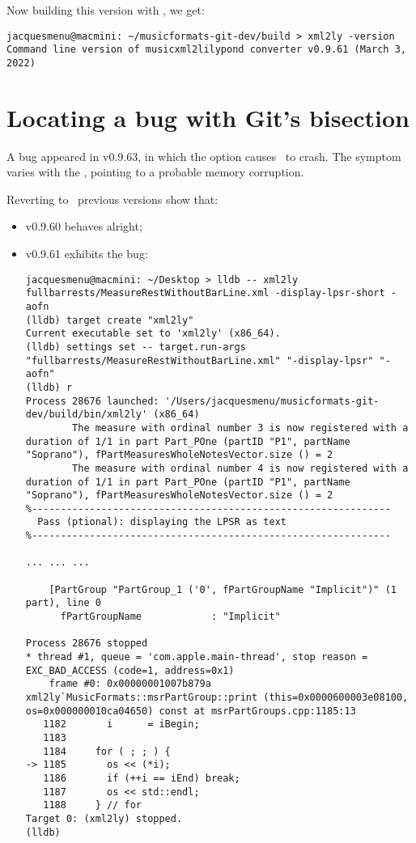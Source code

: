 Now building this version with , we get:
\begin{lstlisting}[language=Terminal]
jacquesmenu@macmini: ~/musicformats-git-dev/build > xml2ly -version
Command line version of musicxml2lilypond converter v0.9.61 (March 3, 2022)
\end{lstlisting}


\chapter{Locating a bug with Git's bisection}

A bug appeared in v0.9.63, in which the  option causes \xmlToLy\ to crash.
The symptom varies with the \OS, pointing to a probable memory corruption.

Reverting to \mf\ previous versions show that:
\begin{itemize}
\item v0.9.60 behaves alright;
\item v0.9.61 exhibits the bug:

\begin{lstlisting}[language=Terminal]
jacquesmenu@macmini: ~/Desktop > lldb -- xml2ly  fullbarrests/MeasureRestWithoutBarLine.xml -display-lpsr-short -aofn
(lldb) target create "xml2ly"
Current executable set to 'xml2ly' (x86_64).
(lldb) settings set -- target.run-args  "fullbarrests/MeasureRestWithoutBarLine.xml" "-display-lpsr" "-aofn"
(lldb) r
Process 28676 launched: '/Users/jacquesmenu/musicformats-git-dev/build/bin/xml2ly' (x86_64)
        The measure with ordinal number 3 is now registered with a duration of 1/1 in part Part_POne (partID "P1", partName "Soprano"), fPartMeasuresWholeNotesVector.size () = 2
        The measure with ordinal number 4 is now registered with a duration of 1/1 in part Part_POne (partID "P1", partName "Soprano"), fPartMeasuresWholeNotesVector.size () = 2
%--------------------------------------------------------------
  Pass (ptional): displaying the LPSR as text
%--------------------------------------------------------------

... ... ...

    [PartGroup "PartGroup_1 ('0', fPartGroupName "Implicit")" (1 part), line 0
      fPartGroupName            : "Implicit"

Process 28676 stopped
* thread #1, queue = 'com.apple.main-thread', stop reason = EXC_BAD_ACCESS (code=1, address=0x1)
    frame #0: 0x00000001007b879a xml2ly`MusicFormats::msrPartGroup::print (this=0x0000600003e08100, os=0x000000010ca04650) const at msrPartGroups.cpp:1185:13
   1182	      i      = iBegin;
   1183
   1184	    for ( ; ; ) {
-> 1185	      os << (*i);
   1186	      if (++i == iEnd) break;
   1187	      os << std::endl;
   1188	    } // for
Target 0: (xml2ly) stopped.
(lldb)
\end{lstlisting}

\end{itemize}

